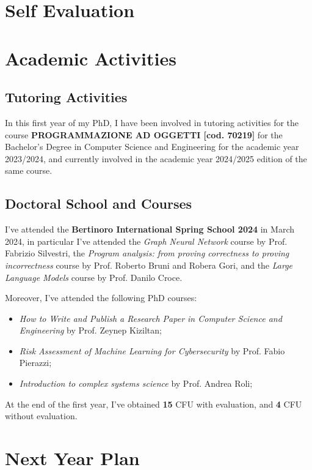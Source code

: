 \documentclass[runningheads]{llncs}
\begin{document}

\section{Self Evaluation}

\section{Academic Activities}

\subsection{Tutoring Activities}

In this first year of my PhD,
I have been involved in tutoring activities for the course \textbf{PROGRAMMAZIONE AD OGGETTI [cod. 70219]} for the Bachelor's Degree in Computer Science and Engineering for the academic year 2023/2024,
and currently involved in the academic year 2024/2025 edition of the same course.

\subsection{Doctoral School and Courses}

I've attended the \textbf{Bertinoro International Spring School 2024} in March 2024,
in particular I've attended the \emph{Graph Neural Network} course by Prof. Fabrizio Silvestri,
the \emph{Program analysis: from proving correctness to proving incorrectness} course by Prof. Roberto Bruni and Robera Gori,
and the \emph{Large Language Models} course by Prof. Danilo Croce.

Moreover,
I've attended the following PhD courses:
\begin{itemize}
    \item \emph{How to Write and Publish a Research Paper in Computer Science and Engineering} by Prof. Zeynep Kiziltan;
    \item \emph{Risk Assessment of Machine Learning for Cybersecurity} by Prof. Fabio Pierazzi;
    \item \emph{Introduction to complex systems science} by Prof. Andrea Roli;
\end{itemize}

At the end of the first year,
I've obtained \textbf{15} CFU with evaluation, and \textbf{4} CFU without evaluation.

\section{Next Year Plan}


%
%
%
\nocite{*}


\end{document}
